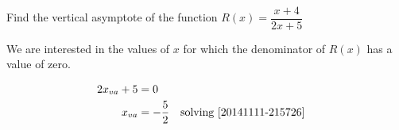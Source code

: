 \begin{example}[id:20141111-192213] \label{20141111-192213} \hfill \\

Find the vertical asymptote of the function $R(x)=\dfrac{x+4}{2x+5}$

\soln

\solnsteps

We are interested in the values of $x$ for which the denominator of $R(x)$ has a value of zero.

\begin{align*}
2x_{va}+5 &= 0 \\
x_{va} &= -\dfrac{5}{2}  &&\text{solving \ref{20141111-215726}} \\
\end{align*}

\begin{center}
	
\end{center}
\end{example}







